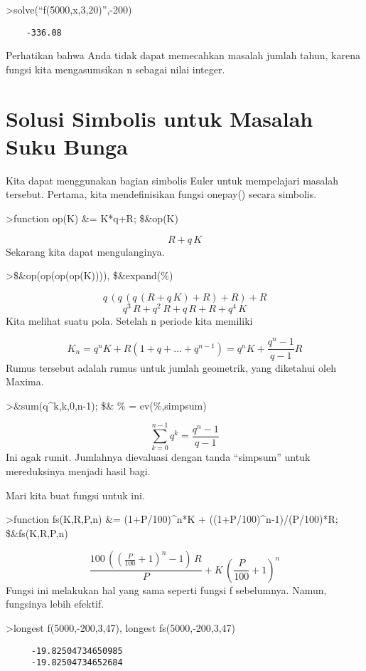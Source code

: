 \documentclass[
]{book}
\begin{document}
\textgreater solve(``f(5000,x,3,20)'',-200)

\begin{verbatim}
    -336.08 
\end{verbatim}

Perhatikan bahwa Anda tidak dapat memecahkan masalah jumlah tahun, karena fungsi kita mengasumsikan n sebagai nilai integer.

\section{Solusi Simbolis untuk Masalah Suku Bunga}\label{solusi-simbolis-untuk-masalah-suku-bunga}

Kita dapat menggunakan bagian simbolis Euler untuk mempelajari masalah tersebut. Pertama, kita mendefinisikan fungsi onepay() secara simbolis.

\textgreater function op(K) \&= K*q+R; \$\&op(K)

\[R+q\,K\]Sekarang kita dapat mengulanginya.

\textgreater\$\&op(op(op(op(K)))), \$\&expand(\%)

\[q\,\left(q\,\left(q\,\left(R+q\,K\right)+R\right)+R\right)+R\] \[q^3\,R+q^2\,R+q\,R+R+q^4\,K\]Kita melihat suatu pola. Setelah n periode kita memiliki

\[K_n = q^n K + R (1+q+\ldots+q^{n-1}) = q^n K + \frac{q^n-1}{q-1} R\]Rumus tersebut adalah rumus untuk jumlah geometrik, yang diketahui oleh Maxima.

\textgreater\&sum(q\^{}k,k,0,n-1); \$\& \% = ev(\%,simpsum)

\[\sum_{k=0}^{n-1}{q^{k}}=\frac{q^{n}-1}{q-1}\]Ini agak rumit. Jumlahnya dievaluasi dengan tanda ``simpsum'' untuk mereduksinya menjadi hasil bagi.

Mari kita buat fungsi untuk ini.

\textgreater function fs(K,R,P,n) \&= (1+P/100)\^{}n*K + ((1+P/100)\^{}n-1)/(P/100)*R; \$\&fs(K,R,P,n)

\[\frac{100\,\left(\left(\frac{P}{100}+1\right)^{n}-1\right)\,R}{P}+K\,\left(\frac{P}{100}+1\right)^{n}\]Fungsi ini melakukan hal yang sama seperti fungsi f sebelumnya. Namun, fungsinya lebih efektif.

\textgreater longest f(5000,-200,3,47), longest fs(5000,-200,3,47)

\begin{verbatim}
     -19.82504734650985 
     -19.82504734652684 
\end{verbatim}
\end{document}
